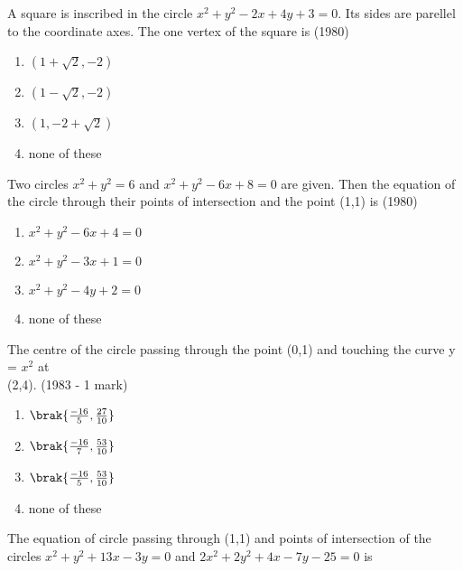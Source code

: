 \iffalse
\title{Circles}
\author{Eshan sharma}
\section{mcq-single}
\fi

    \item A square is inscribed in the circle $x^{2} + y^{2} - 2x +4y +3= 0.$ Its sides are parellel to the coordinate axes. The one vertex of the square is \hfill {(1980)}
    \begin{multicols}{2}
    \begin{enumerate}
    \item $(1+\sqrt{2}, -2)$ 
    \item $(1-\sqrt{2}, -2)$
    \item $(1, -2 +\sqrt{2})$
    \item none of these
    \end{enumerate}
    \end{multicols}
    \item Two circles $x^{2} + y^{2} = 6$ and $x^{2} + y^{2}-6x +8=0$ are given. Then the equation of the circle through their points of intersection and the point (1,1) is \hfill {(1980)}
    \begin{enumerate}
    \item $x^{2}+y^{2}-6x+4=0$ 
    \item $x^{2}+y^{2}-3x+1=0$
    \item $x^{2}+y^{2}-4y+2=0$
    \item none of these
    \end{enumerate}
    \item The centre of the circle passing through the point (0,1) and touching the curve y = $x^{2}$ at \\ (2,4).
    \hfill {(1983 - 1 mark)}
    \begin{multicols}{2}
    \begin{enumerate}
    \item $\brak{\frac{-16}{5},\frac{27}{10}}$
    \item $\brak{\frac{-16}{7},\frac{53}{10}}$
    \item $\brak{\frac{-16}{5},\frac{53}{10}}$
    \item none of these
    \end{enumerate}
    \end{multicols}
    \item The equation of circle passing through (1,1) and points of intersection of the circles $x^{2}+y^{2}+13x-3y=0$ and $2x^{2}+2y^{2}+4x-7y-25=0$ is
